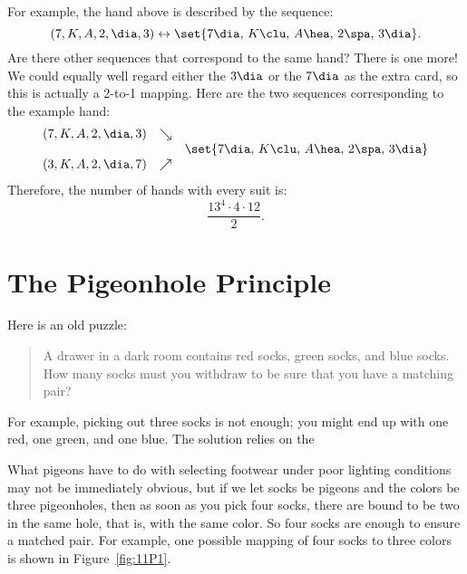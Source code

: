 For example, the hand above is described by the sequence:
%
\[
(7, K, A, 2, \dia, 3) \leftrightarrow 
    \set{ 7 \dia, \, K \clu, \, A \hea, \, 2 \spa, \, 3 \dia  }.
\]
%
Are there other sequences that correspond to the same hand?  There is
one more!  We could equally well regard either the $3 \dia$ or the $7
\dia$ as the extra card, so this is actually a 2-to-1 mapping.  Here
are the two sequences corresponding to the example hand:
%
\[
\begin{array}{rcl}
(7, K, A, 2, \dia, 3) & \searrow & \\
 && \set{ 7 \dia, \, K \clu, \, A \hea, \, 2 \spa, \, 3 \dia } \\
(3, K, A, 2, \dia, 7) & \nearrow &
\end{array}
\]
%
Therefore, the number of hands with every suit is:
%
\[
\frac{13^4 \cdot 4 \cdot 12}{2}.
\]

\begin{problems}
\practiceproblems
{}

\classproblems


\examproblems
{}

\end{problems}


\section{The Pigeonhole Principle}\label{pigeon_hole_sec}

Here is an old puzzle:

\begin{quotation}
\noindent A drawer in a dark room contains red socks, green socks, and
blue socks.  How many socks must you withdraw to be sure that you have
a matching pair?
\end{quotation}

For example, picking out three socks is not enough; you might end up
with one red, one green, and one blue.  The solution relies on the


What pigeons have to do with selecting footwear under poor lighting
conditions may not be immediately obvious, but if we let socks be
pigeons and the colors be three pigeonholes, then as soon as you pick
four socks, there are bound to be two in the same hole, that is, with
the same color.  So four socks are enough to ensure a matched
pair.  For example, one possible mapping of four socks to three colors
is shown in Figure~\ref{fig:11P1}.

